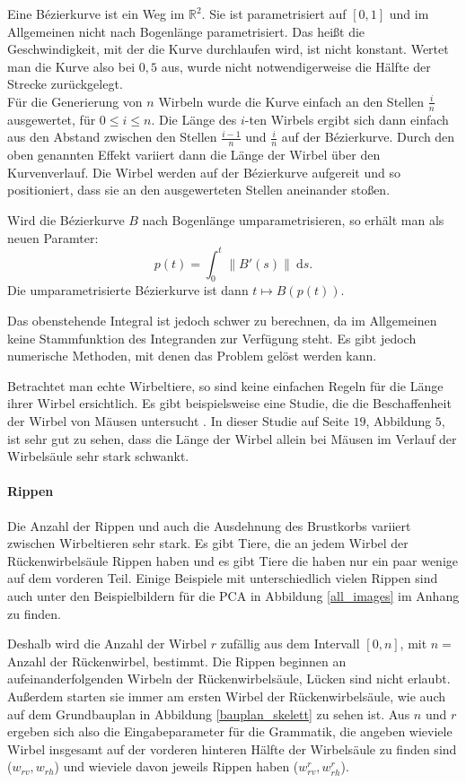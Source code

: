 Eine Bézierkurve ist ein Weg im $\mathbb{R}^2$. Sie ist parametrisiert auf $[0, 1]$ und im Allgemeinen nicht nach Bogenlänge parametrisiert. Das heißt die Geschwindigkeit, mit der die Kurve durchlaufen wird, ist nicht konstant. Wertet man die Kurve also bei $0,5$ aus, wurde nicht notwendigerweise die Hälfte der Strecke zurückgelegt.\\
Für die Generierung von $n$ Wirbeln wurde die Kurve einfach an den Stellen $\frac{i}{n}$ ausgewertet, für $0 \leq i \leq n$. Die Länge des $i$-ten Wirbels ergibt sich dann einfach aus den Abstand zwischen den Stellen $\frac{i-1}{n}$ und $\frac{i}{n}$ auf der Bézierkurve. Durch den oben genannten Effekt variiert dann die Länge der Wirbel über den Kurvenverlauf. Die Wirbel werden auf der Bézierkurve aufgereit und so positioniert, dass sie an den ausgewerteten Stellen aneinander stoßen.

Wird die Bézierkurve $B$ nach Bogenlänge umparametrisieren, so erhält man als neuen Paramter:
\[p(t) = \int_0^t \| B'(s) \| ~\mathrm{d}s. \]
Die umparametrisierte Bézierkurve ist dann $t \mapsto B(p(t))$.

Das obenstehende Integral ist jedoch schwer zu berechnen, da im Allgemeinen keine Stammfunktion des Integranden zur Verfügung steht. Es gibt jedoch numerische Methoden, mit denen das Problem gelöst werden kann. \cite{ArcLengthParametrization}

Betrachtet man echte Wirbeltiere, so sind keine einfachen Regeln für die Länge ihrer Wirbel ersichtlich. Es gibt beispielsweise eine Studie, die die Beschaffenheit der  Wirbel von Mäusen untersucht \cite{MouseVertebrae}. In dieser Studie auf Seite $19$, Abbildung $5$, ist sehr gut zu sehen, dass die Länge der Wirbel allein bei Mäusen im Verlauf der Wirbelsäule sehr stark schwankt.

\paragraph{Rippen}
Die Anzahl der Rippen und auch die Ausdehnung des Brustkorbs variiert zwischen Wirbeltieren sehr stark. Es gibt Tiere, die an jedem Wirbel der Rückenwirbelsäule Rippen haben und es gibt Tiere die haben nur ein paar wenige auf dem vorderen Teil. Einige Beispiele mit unterschiedlich vielen Rippen sind auch unter den Beispielbildern für die PCA in Abbildung \ref{all_images} im Anhang zu finden.

Deshalb wird die Anzahl der Wirbel $r$ zufällig aus dem Intervall $ [0, n]$, mit $n =$ Anzahl der Rückenwirbel, bestimmt.
Die Rippen beginnen an aufeinanderfolgenden Wirbeln der Rückenwirbelsäule, Lücken sind nicht erlaubt. Außerdem starten sie immer am ersten Wirbel der Rückenwirbelsäule, wie auch auf dem Grundbauplan in Abbildung \ref{bauplan_skelett} zu sehen ist. Aus $n$ und $r$ ergeben sich also die Eingabeparameter für die Grammatik, die angeben wieviele Wirbel insgesamt auf der vorderen \bzw hinteren Hälfte der Wirbelsäule zu finden sind ($w_{rv}, w_{rh}$) und wieviele davon jeweils Rippen haben ($w_{rv}^r, w_{rh}^r$).


